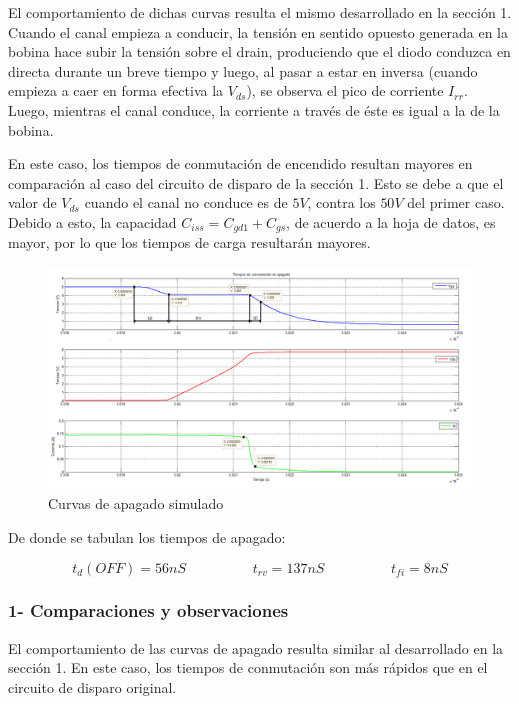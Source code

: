 \documentclass[e4_tp1_main.tex]{subfiles}
\begin{document}
El comportamiento de dichas curvas resulta el mismo desarrollado en la sección 1. Cuando el canal empieza a conducir, la tensión en sentido opuesto generada en la bobina hace subir la tensión sobre el drain, produciendo que el diodo conduzca en directa durante un breve tiempo y luego, al pasar a estar en inversa (cuando empieza a caer en forma efectiva la $V_{ds}$), se observa el pico de corriente $I_{rr}$. Luego, mientras el canal conduce, la corriente a través de éste es igual a la de la bobina.\par
En este caso, los tiempos de conmutación de encendido resultan mayores en comparación al caso del circuito de disparo de la sección 1. Esto se debe a que el valor de $V_{ds}$ cuando el canal no conduce es de $5V$, contra los $50V$ del primer caso. Debido a esto, la capacidad $C_{iss} = C_{gd1} + C_{gs}$, de acuerdo a la hoja de datos, es mayor, por lo que los tiempos de carga resultarán mayores.

\begin{figure}[H]
\centering
\includegraphics[width=1\linewidth]{Imagenes/Punto3/tiempos_apagadoX.png}
\caption{Curvas de apagado simulado}
\end{figure}

De donde se tabulan los tiempos de apagado:

\[
t_d(OFF) = 56nS \hspace{2cm} t_{rv} = 137nS \hspace{2cm} t_{fi} = 8nS 
\]

\subsubsection*{1- Comparaciones y observaciones}

El comportamiento de las curvas de apagado resulta similar al desarrollado en la sección 1. En este caso, los tiempos de conmutación son más rápidos que en el circuito de disparo original.
\end{document}
